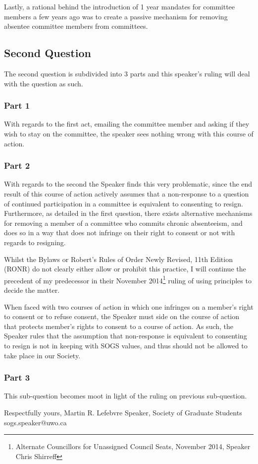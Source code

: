 \begin{multicols}{2}
Lastly, a rational behind the introduction of 1 year mandates for committee members a few years ago was to create a passive mechanism for removing absentee committee members from committees. 


\subsection*{Second Question}

The second question is subdivided into 3 parts and this speaker's ruling will deal with the question as such. 
\subsubsection*{Part 1}
With regards to the first act, emailing the committee member and asking if they wish to stay on the committee, the speaker sees nothing wrong with this course of action. 

\subsubsection*{Part 2}
With regards to the second the Speaker finds this very problematic, since the end result of this course of action actively assumes that a non-response to a question of continued participation in a committee is equivalent to consenting to resign. Furthermore, as detailed in the first question, there exists alternative mechanisms for removing a member of a committee who commits chronic absenteeism, and does so in a way that does not infringe on their right to consent or not with regards to resigning.    

Whilst the Bylaws or Robert's Rules of Order Newly Revised, 11th Edition (RONR) do not clearly either allow or prohibit this practice, I will continue the precedent of my predecessor in their November 2014\footnote{Alternate Councillors for Unassigned Council Seats, November 2014, Speaker Chris Shirreff} ruling of using principles to decide the matter.  

When faced with two courses of action in which one infringes on a member's right to consent or to refuse consent, the Speaker must side on the course of action that protects member's rights to consent to a course of action.  As such, the Speaker rules that the assumption that non-response is equivalent to consenting to resign is not in keeping with SOGS values, and thus should not be allowed to take place in our Society.  
	
\subsubsection*{Part 3}
This sub-question becomes moot in light of the ruling on previous sub-question. 

\end{multicols}


\vskip 3cm
\noindent
Respectfully yours, \newline
\noindent
Martin R. Lefebvre \newline
\indent
Speaker, \newline 
\indent
Society of Graduate Students \newline
\indent
sogs.speaker@uwo.ca \newline